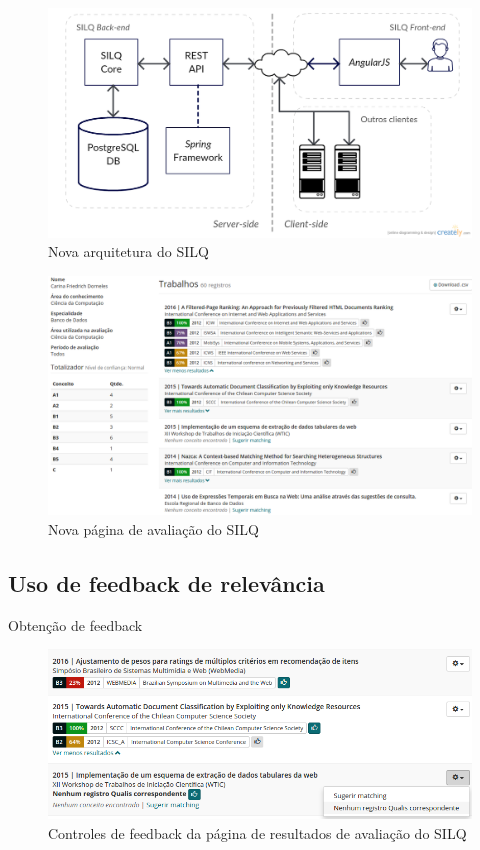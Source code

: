 \documentclass{beamer}
\begin{document}
\begin{frame}
  \begin{figure}
    \includegraphics[width=\textwidth]{figuras/arquitetura-silq.png}
    \caption{Nova arquitetura do SILQ}
  \end{figure}
\end{frame}

\begin{frame}
  \begin{figure}
    \includegraphics[width=\textwidth]{figuras/avaliacao-silq2.png}
    \caption{Nova página de avaliação do SILQ}
  \end{figure}
\end{frame}

\subsection{Uso de feedback de relevância}

\begin{frame}{Obtenção de feedback}
  \begin{figure}
    \includegraphics[width=\textwidth]{figuras/feedbacks.png}
    \caption{Controles de feedback da página de resultados de avaliação do SILQ}
  \end{figure}
\end{frame}
\end{document}
